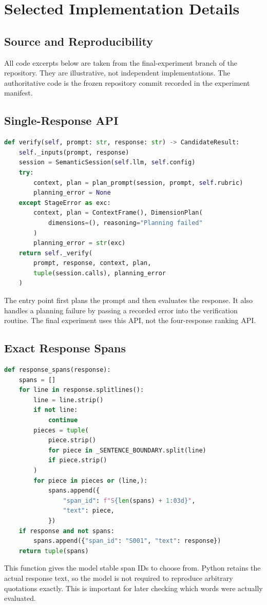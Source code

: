 \chapter{Selected Implementation Details}
\label{app:code}
\section{Source and Reproducibility}
All code excerpts below are taken from the final-experiment branch of the repository. They are illustrative, not independent implementations. The authoritative code is the frozen repository commit recorded in the experiment manifest.
\section{Single-Response API}
\begin{lstlisting}[language=Python,caption={Single-response entry point in src/cultverify/pipeline.py.}]
def verify(self, prompt: str, response: str) -> CandidateResult:
    self._inputs(prompt, response)
    session = SemanticSession(self.llm, self.config)
    try:
        context, plan = plan_prompt(session, prompt, self.rubric)
        planning_error = None
    except StageError as exc:
        context, plan = ContextFrame(), DimensionPlan(
            dimensions=(), reasoning="Planning failed"
        )
        planning_error = str(exc)
    return self._verify(
        prompt, response, context, plan,
        tuple(session.calls), planning_error
    )
\end{lstlisting}
The entry point first plans the prompt and then evaluates the response. It also handles a planning failure by passing a recorded error into the verification routine. The final experiment uses this API, not the four-response ranking API.
\section{Exact Response Spans}
\begin{lstlisting}[language=Python,caption={Response span selection in src/cultverify/targets.py.}]
def response_spans(response):
    spans = []
    for line in response.splitlines():
        line = line.strip()
        if not line:
            continue
        pieces = tuple(
            piece.strip()
            for piece in _SENTENCE_BOUNDARY.split(line)
            if piece.strip()
        )
        for piece in pieces or (line,):
            spans.append({
                "span_id": f"S{len(spans) + 1:03d}",
                "text": piece,
            })
    if response and not spans:
        spans.append({"span_id": "S001", "text": response})
    return tuple(spans)
\end{lstlisting}
This function gives the model stable span IDs to choose from. Python retains the actual response text, so the model is not required to reproduce arbitrary quotations exactly. This is important for later checking which words were actually evaluated.
